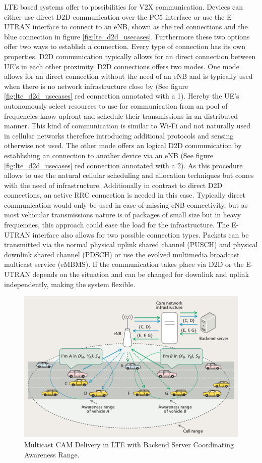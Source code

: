 \documentclass[conference,12pt,onecolumn]{IEEEtran}
\begin{document}
LTE based systems offer to possibilities for V2X communication. Devices can either use direct D2D communication over the PC5 interface or use the E-UTRAN interface to connect to an eNB, shown as the red connections and the blue connection in figure \ref{fig:lte_d2d_usecases}. Furthermore these two options offer two ways to establish a connection. Every type of connection has its own properties. D2D communication typically allows for an direct connection between UE's in each other proximity. D2D connections offers two modes. One mode allows for an direct connection without the need of an eNB and is typically used when there is no network infrastructure close by (See figure \ref{fig:lte_d2d_usecases} red connection annotated with a 1). Hereby the UE's autonomously select resources to use for communication from an pool of frequencies know upfront and schedule their transmissions in an distributed manner. This kind of communication is similar to Wi-Fi and not naturally used in cellular networks therefore introducing additional protocols and sensing otherwise not used. The other mode offers an logical D2D communication by establishing an connection to another device via an eNB (See figure \ref{fig:lte_d2d_usecases} red connection annotated with a 2). As this procedure allows to use the natural cellular scheduling and allocation techniques but comes with the need of infrastructure. Additionally in contrast to direct D2D connections, an active RRC connection is needed in this case. Typically direct communication would only be used in case of missing eNB connectivity, but as most vehicular transmissions nature is of packages of small size but in heavy frequencies, this approach could ease the load for the infrastructure.
The E-UTRAN interface also allows for two possible connection types. Packets can be transmitted via the normal physical uplink shared channel (PUSCH) and physical downlink shared channel (PDSCH) or use the evolved multimedia broadcast multicast service (eMBMS). If the communication takes place via D2D or the E-UTRAN depends on the situation and can be changed for downlink and uplink independently, making the system flexible.

\begin{figure} [ht]
   \centering
   \includegraphics[width=0.6\linewidth]{_Graphics/lte_backendserver.png}
  \caption{Multicast CAM Delivery in LTE with Backend Server Coordinating Awareness Range. \cite{araniti2013}}
  \label{fig:lte_backendserver}
\end{figure}
\end{document}
